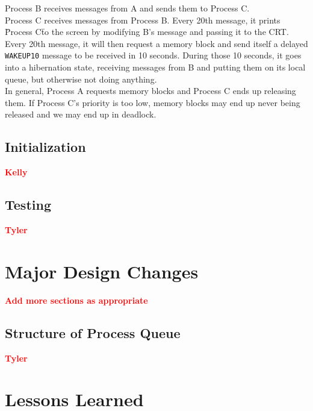 \documentclass[12pt]{report}
\begin{document}
Process B receives messages from A and sends them to Process C.\\

Process C receives messages from Process B. Every 20th message, it prints \"Process C\" to the screen by modifying B's message and passing it to the CRT. Every 20th message, it will then request a memory block and send itself a delayed {\tt WAKEUP10} message to be received in 10 seconds. During those 10 seconds, it goes into a hibernation state, receiving messages from B and putting them on its local queue, but otherwise not doing anything.\\

In general, Process A requests memory blocks and Process C ends up releasing them. If Process C's priority is too low, memory blocks may end up never being released and we may end up in deadlock.\\

\section{Initialization}

\textcolor{red}{\textbf{Kelly}} \\



\section{Testing}

\textcolor{red}{\textbf{Tyler}} \\


\chapter{Major Design Changes}

\textcolor{red}{\textbf{Add more sections as appropriate}} \\

\section{Structure of Process Queue}

\textcolor{red}{\textbf{Tyler}} \\




\chapter{Lessons Learned}
\end{document}
